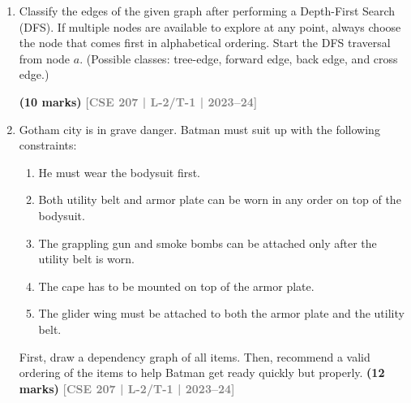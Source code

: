 \documentclass[12pt]{article}
\newcommand{\yr}[1]{\hfill\textcolor{gray}{\small\textbf{[#1]}}}
\newcommand{\mk}[1]{\textcolor{orange!70!black}{\small\textbf{(#1 marks)}}}
\begin{document}
\begin{enumerate}

\item Classify the edges of the given graph after performing a Depth-First Search (DFS). If multiple nodes are available to explore at any point, always choose the node that comes first in alphabetical ordering. Start the DFS traversal from node $a$. (Possible classes: tree-edge, forward edge, back edge, and cross edge.)
\begin{center}
\end{center}
\mk{10} \yr{CSE 207 | L-2/T-1 | 2023--24}


\item Gotham city is in grave danger. Batman must suit up with the following constraints:
\begin{enumerate}
\item  He must wear the bodysuit first. 
\item  Both utility belt and armor plate can be worn in any order on top of the bodysuit. 
\item  The grappling gun and smoke bombs can be attached only after the utility belt is worn.
\item  The cape has to be mounted on top of the armor plate. 
\item  The glider wing must be attached to both the armor plate and the utility belt. 
\end{enumerate}
First, draw a dependency graph of all items. Then, recommend a valid ordering of the items to help Batman get ready quickly but properly.
\mk{12} \yr{CSE 207 | L-2/T-1 | 2023--24}



\end{enumerate}
\end{document}

